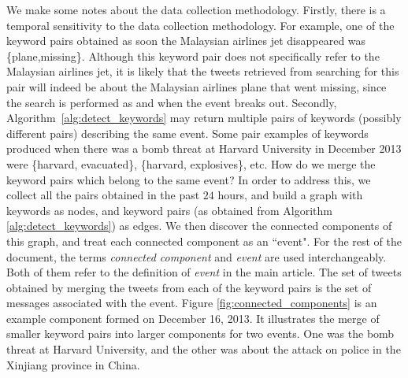 \documentclass[10pt,letterpaper]{article}
\begin{document}
We make some notes about the data collection methodology. Firstly,
there is a temporal sensitivity to the data collection methodology.
For example, one of the keyword pairs obtained as soon the Malaysian
airlines jet disappeared was \{plane,missing\}. Although this keyword
pair does not specifically refer to the Malaysian airlines jet, it is
likely that the tweets retrieved from searching for this pair will
indeed be about the Malaysian airlines plane that went missing, since
the search is performed as and when the event breaks out. Secondly,
Algorithm~\ref{alg:detect_keywords} may return multiple pairs of
keywords (possibly different pairs) describing the same event. Some
pair examples of keywords produced when there was a bomb threat at
Harvard University in December 2013 were \{harvard, evacuated\},
\{harvard, explosives\}, etc. How do we merge the keyword pairs which
belong to the same event? In order to address this, we collect all the
pairs obtained in the past $24$ hours, and build a graph with keywords
as nodes, and keyword pairs (as obtained from Algorithm
{\ref{alg:detect_keywords}}) as edges. We then discover the connected
components of this graph, and treat each connected component as an
``event".  For the rest of the document, the terms \emph{connected component}
and \emph{event} are used interchangeably.  Both of them refer to the definition
of \emph{event} in the main article.
The set of tweets obtained
by merging the tweets from each of the keyword pairs is the set of
messages associated with the event. Figure
\ref{fig:connected_components} is an example component formed on
December 16, 2013. It illustrates the merge of smaller keyword pairs
into larger components for two events. One was the bomb threat at
Harvard University, and the other was about the attack on police in
the Xinjiang province in China.
\end{document}
